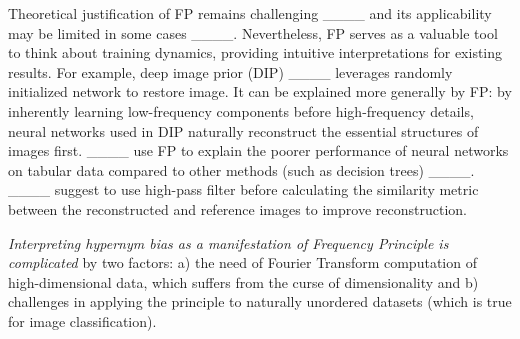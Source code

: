 Theoretical justification of FP remains challenging ____ and
its applicability may be limited in some cases ____.
Nevertheless, FP serves as a valuable tool to think about training dynamics,
providing intuitive interpretations for existing results. For example, deep
image prior (DIP) ____ leverages randomly initialized network
to restore image. It can be explained more generally by FP: by inherently
learning low-frequency components before high-frequency details, neural networks
used in DIP naturally reconstruct the essential structures of images first.
____ use FP to explain the poorer performance of neural
networks on tabular data compared to other methods (such as decision trees)
____. ____ suggest to use high-pass
filter before calculating the similarity metric between the reconstructed and
reference images to improve reconstruction.



\textit{Interpreting hypernym bias as a manifestation of Frequency Principle is
  complicated} by two factors: a) the need of Fourier Transform computation of
high-dimensional data, which suffers from the curse of dimensionality and b)
challenges in applying the principle to naturally unordered datasets (which is
true for image classification).




